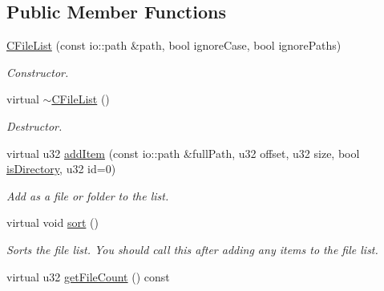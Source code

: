 \subsection*{Public Member Functions}
\begin{DoxyCompactItemize}
\item 
\hyperlink{classirr_1_1io_1_1_c_file_list_a15d8fa324fa6eac8675c47c2bdaef896}{C\-File\-List} (const io\-::path \&path, bool ignore\-Case, bool ignore\-Paths)
\begin{DoxyCompactList}\small\item\em Constructor. \end{DoxyCompactList}\item 
\hypertarget{classirr_1_1io_1_1_c_file_list_a12ca193bc3e5a2f9639ef073f897694f}{virtual \hyperlink{classirr_1_1io_1_1_c_file_list_a12ca193bc3e5a2f9639ef073f897694f}{$\sim$\-C\-File\-List} ()}\label{classirr_1_1io_1_1_c_file_list_a12ca193bc3e5a2f9639ef073f897694f}

\begin{DoxyCompactList}\small\item\em Destructor. \end{DoxyCompactList}\item 
virtual u32 \hyperlink{classirr_1_1io_1_1_c_file_list_aa8d4016f45fdae8635ba7fb8eddb8359}{add\-Item} (const io\-::path \&full\-Path, u32 offset, u32 size, bool \hyperlink{classirr_1_1io_1_1_c_file_list_a3645565326ce02e92020ef49de271df6}{is\-Directory}, u32 id=0)
\begin{DoxyCompactList}\small\item\em Add as a file or folder to the list. \end{DoxyCompactList}\item 
\hypertarget{classirr_1_1io_1_1_c_file_list_aef23d20075d471e461a1fdd71068bb6d}{virtual void \hyperlink{classirr_1_1io_1_1_c_file_list_aef23d20075d471e461a1fdd71068bb6d}{sort} ()}\label{classirr_1_1io_1_1_c_file_list_aef23d20075d471e461a1fdd71068bb6d}

\begin{DoxyCompactList}\small\item\em Sorts the file list. You should call this after adding any items to the file list. \end{DoxyCompactList}\item 
\hypertarget{classirr_1_1io_1_1_c_file_list_af0167a1c099ac13a8829a66d5a8fae3d}{virtual u32 \hyperlink{classirr_1_1io_1_1_c_file_list_af0167a1c099ac13a8829a66d5a8fae3d}{get\-File\-Count} () const }\label{classirr_1_1io_1_1_c_file_list_af0167a1c099ac13a8829a66d5a8fae3d}


\end{DoxyCompactItemize}

